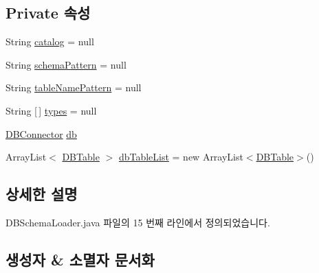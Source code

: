 \subsection*{Private 속성}
\begin{DoxyCompactItemize}
\item 
String \mbox{\hyperlink{classcom_1_1github_1_1aites_1_1framework_1_1ruleset_1_1_d_b_schema_loader_a78610ecd443794c2705a60e645c07e08}{catalog}} = null
\item 
String \mbox{\hyperlink{classcom_1_1github_1_1aites_1_1framework_1_1ruleset_1_1_d_b_schema_loader_a9941bd9397c59438781cf44f1edd0cd6}{schema\+Pattern}} = null
\item 
String \mbox{\hyperlink{classcom_1_1github_1_1aites_1_1framework_1_1ruleset_1_1_d_b_schema_loader_a8f8b9bb76c0822247353f8e100f28a31}{table\+Name\+Pattern}} = null
\item 
String \mbox{[}$\,$\mbox{]} \mbox{\hyperlink{classcom_1_1github_1_1aites_1_1framework_1_1ruleset_1_1_d_b_schema_loader_addaa87f4675041eabcd34e291f108ebe}{types}} = null
\item 
\mbox{\hyperlink{classcom_1_1github_1_1aites_1_1framework_1_1globalknowledge_1_1_d_b_connector}{D\+B\+Connector}} \mbox{\hyperlink{classcom_1_1github_1_1aites_1_1framework_1_1ruleset_1_1_d_b_schema_loader_a2a610ebcfca7102369293e6728d0e9e2}{db}}
\item 
Array\+List$<$ \mbox{\hyperlink{classcom_1_1github_1_1aites_1_1framework_1_1dbcomponent_1_1_d_b_table}{D\+B\+Table}} $>$ \mbox{\hyperlink{classcom_1_1github_1_1aites_1_1framework_1_1ruleset_1_1_d_b_schema_loader_acacde0e67bd33c28127d235e7fb8aebf}{db\+Table\+List}} = new Array\+List$<$\mbox{\hyperlink{classcom_1_1github_1_1aites_1_1framework_1_1dbcomponent_1_1_d_b_table}{D\+B\+Table}}$>$()
\end{DoxyCompactItemize}


\subsection{상세한 설명}


D\+B\+Schema\+Loader.\+java 파일의 15 번째 라인에서 정의되었습니다.



\subsection{생성자 \& 소멸자 문서화}
\mbox{\label{classcom_1_1github_1_1aites_1_1framework_1_1ruleset_1_1_d_b_schema_loader_a9ba40bda7e783bdee59222d04d4af490}} 
